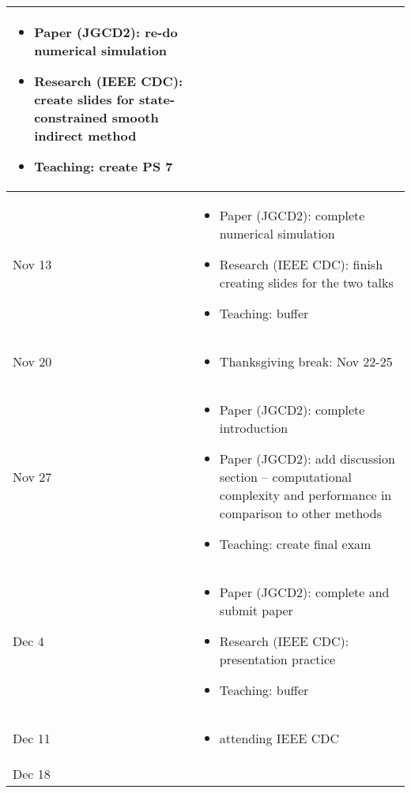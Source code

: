 \documentclass{article}
\begin{document}
\begin{center}
\begin{xltabular}{\linewidth}{ s | M }
\begin{itemize}
\item 
Paper (JGCD2): re-do numerical simulation
\item 
Research (IEEE CDC): create slides for state-constrained smooth indirect method
\item 
Teaching: create PS 7
\end{itemize}
\\
\hline
Nov 13 	&
\begin{itemize}
\item 
Paper (JGCD2): complete numerical simulation
\item 
Research (IEEE CDC): finish creating slides for the two talks
\item 
Teaching: buffer
\end{itemize}
\\
\hline
Nov 20 	&
\begin{itemize}
\item 
Thanksgiving break: Nov 22-25
\end{itemize}
\\
\hline
Nov 27 	&
\begin{itemize}
\item 
Paper (JGCD2): complete introduction
\item 
Paper (JGCD2): add discussion section -- computational complexity and performance in comparison to other methods 
\item 
Teaching: create final exam
\end{itemize}
\\
\hline
Dec 4 	&
\begin{itemize}
\item 
Paper (JGCD2): complete and submit paper
\item 
Research (IEEE CDC): presentation practice
\item 
Teaching: buffer
\end{itemize}
\\
\hline
Dec 11 	&
\begin{itemize}
\item 
attending IEEE CDC
\end{itemize}
\\
\hline
Dec 18 	&
\begin{itemize}

\end{itemize}
\end{xltabular}
\end{center}
\end{document}

